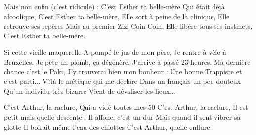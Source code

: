 \beginverse
Mais non enfin (c'est ridicule) :
C'est Esther ta belle-mère
Qui était déjà alcoolique,
C'est Esther ta belle-mère,
Elle sort à peine de la clinique,
Elle retrouve ses repères
Mais au premier Zizi Coin Coin,
Elle libère tous ses instincts,
C'est Esther ta belle-mère.
\endverse

\beginverse
Si cette vieille maquerelle
A pompé le jus de mon père,
Je rentre à vélo à Bruxelles,
Je pète un plomb, ça dégénère.
J'arrive à passé 23 heures,
Ma dernière chance c'est le Paki,
J'y trouverai bien mon bonheur :
Une bonne Trappiste et c'est parti...
V?là le métèque qui me déclare
Dans un français un peu douteux
Qu'un individu très bizarre
Vient de dévaliser les lieux...
\endverse

\beginchorus
C'est Arthur, la raclure,
Qui a vidé toutes mes 50
C'est Arthur, la raclure,
Il est petit mais quelle descente !
Il affone, c'est un dur
Mais quand il sent vibrer sa glotte
Il boirait même l'eau des chiottes
C'est Arthur, quelle enflure !
\endchorus

\endsong    
